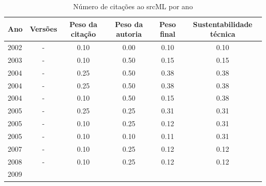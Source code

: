 \begin{table}[H]
\caption{Número de citações ao srcML por ano}
\centering
\begin{tabular}{| l | c | c | c | c | c |}
  \hline
  Ano & Versões & Peso da citação & Peso da autoria & Peso final & Sustentabilidade técnica \\
  \hline
            2002
          &
          -
          &
          0.10
          &
          0.00
          &
          0.10
          &
            {\color{red} 0.10}
          \\
\hline
            2003
          &
          -
          &
          0.10
          &
          0.50
          &
          0.15
          &
            {\color{red} 0.15}
          \\
\hline
            2004
          &
          -
          &
          0.25
          &
          0.50
          &
          0.38
          &
            {\color{red} 0.38}
          \\
            2004
          &
          -
          &
          0.25
          &
          0.50
          &
          0.38
          &
            {\color{red} 0.38}
          \\
            2004
          &
          -
          &
          0.10
          &
          0.50
          &
          0.15
          &
            {\color{red} 0.38}
          \\
\hline
            2005
          &
          -
          &
          0.25
          &
          0.25
          &
          0.31
          &
            {\color{red} 0.31}
          \\
            2005
          &
          -
          &
          0.10
          &
          0.25
          &
          0.12
          &
            {\color{red} 0.31}
          \\
            2005
          &
          -
          &
          0.10
          &
          0.10
          &
          0.11
          &
            {\color{red} 0.31}
          \\
\hline
            2007
          &
          -
          &
          0.10
          &
          0.25
          &
          0.12
          &
            {\color{red} 0.12}
          \\
\hline
            2008
          &
          -
          &
          0.10
          &
          0.25
          &
          0.12
          &
            {\color{red} 0.12}
          \\
\hline
            2009
          &

\end{tabular}
\end{table}
